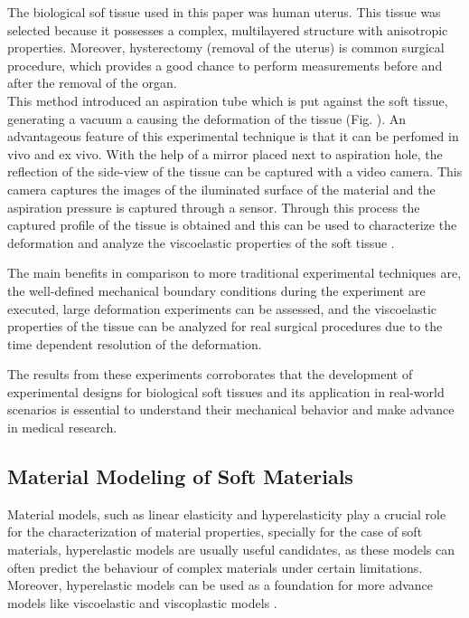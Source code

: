 The biological sof tissue used in this paper was human uterus. This tissue was selected 
because it possesses a complex, multilayered structure with anisotropic properties. 
Moreover, hysterectomy (removal of the uterus) is common surgical procedure, which 
provides a good chance to perform measurements before and after the removal of the organ.\\

This method introduced an aspiration tube which is put against the 
soft tissue, generating a vacuum a causing the deformation of the tissue (Fig. ). 
An advantageous feature of this experimental technique is that 
it can be perfomed in vivo and ex vivo.
With the help of a mirror placed next to aspiration hole, the reflection 
of the side-view of the tissue can be captured with a video camera.
This camera captures the images of the iluminated surface of the material and the 
aspiration pressure is captured through a sensor. Through this process the captured 
profile of the tissue is obtained and this can be used to characterize the deformation 
and analyze the viscoelastic properties of the soft tissue \cite{Kauer2002}.

The main benefits in comparison to more traditional experimental techniques are, 
the well-defined mechanical boundary conditions during the experiment are executed, 
large deformation experiments can be assessed, and the viscoelastic
properties of the tissue can be analyzed for real surgical procedures due to 
the time dependent resolution of the deformation.

The results from these experiments corroborates that the development of experimental designs for
biological soft tissues and its application in real-world scenarios is essential to understand 
their mechanical behavior and make advance in medical research.

\subsection{Material Modeling of Soft Materials}

Material models, such as linear elasticity and hyperelasticity play a crucial role for the characterization 
of material properties, specially for the case of soft materials, hyperelastic models are usually 
useful candidates, as these models can often predict the behaviour of complex materials under certain limitations.
Moreover, hyperelastic models can be used as a foundation for more advance models like 
viscoelastic and viscoplastic models \cite{Bergström2015}. 

